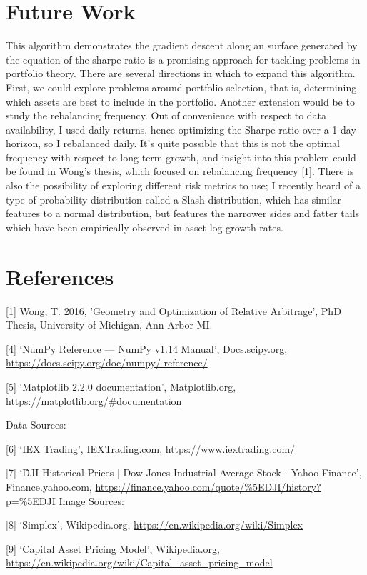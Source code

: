 \documentclass{article}
\begin{document}
\section{Future Work}
This algorithm demonstrates the gradient descent along an surface generated by the equation of the sharpe ratio is a promising approach for tackling problems in portfolio theory. There are several directions in which to expand this algorithm.
First, we could explore problems around portfolio selection, that is, determining which assets are best to include in the portfolio.
Another extension would be to study the rebalancing frequency. Out of convenience with respect to data availability, I used daily returns, hence optimizing the Sharpe ratio over a 1-day horizon, so I
rebalanced daily. It’s quite possible that this is not the optimal frequency with respect to long-term growth, and insight into this problem could be found in Wong’s thesis, which focused on rebalancing frequency [1].
There is also the possibility of exploring different risk metrics to use; I recently heard of a type of probability distribution called a Slash distribution, which has similar features to a normal distribution, but features the narrower sides and fatter tails which have been empirically observed in asset log growth rates.

\newpage
\section*{References}
[1] Wong, T. 2016, ’Geometry and Optimization of Relative Arbitrage’, PhD Thesis, University of Michigan, Ann Arbor MI.

[4] ‘NumPy Reference — NumPy v1.14 Manual’, Docs.scipy.org, \url{https://docs.scipy.org/doc/numpy/ reference/}

[5] ‘Matplotlib 2.2.0 documentation’, Matplotlib.org, \url{https://matplotlib.org/#documentation}

Data Sources:

[6] ‘IEX Trading’, IEXTrading.com, \url{https://www.iextrading.com/}

[7] ‘\^DJI Historical Prices | Dow Jones Industrial Average Stock - Yahoo Finance’, Finance.yahoo.com, \url{https://finance.yahoo.com/quote/\%5EDJI/history?p=\%5EDJI}
Image Sources:

[8] ‘Simplex’, Wikipedia.org, \url{https://en.wikipedia.org/wiki/Simplex}

[9] `Capital Asset Pricing Model', Wikipedia.org, \url{https://en.wikipedia.org/wiki/Capital_asset_pricing_model}
\end{document}

